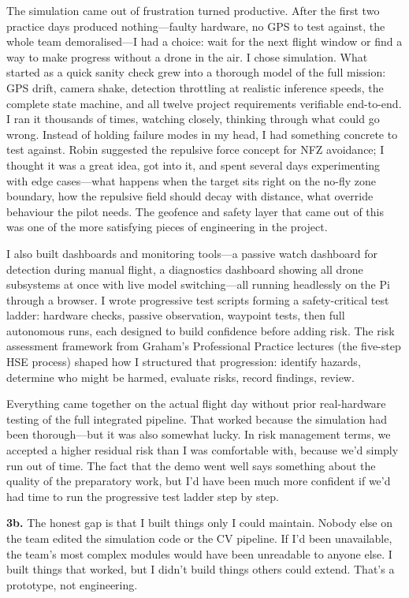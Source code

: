 The simulation came out of frustration turned productive. After the first two practice days produced nothing---faulty hardware, no GPS to test against, the whole team demoralised---I had a choice: wait for the next flight window or find a way to make progress without a drone in the air. I chose simulation. What started as a quick sanity check grew into a thorough model of the full mission: GPS drift, camera shake, detection throttling at realistic inference speeds, the complete state machine, and all twelve project requirements verifiable end-to-end. I ran it thousands of times, watching closely, thinking through what could go wrong. Instead of holding failure modes in my head, I had something concrete to test against. Robin suggested the repulsive force concept for NFZ avoidance; I thought it was a great idea, got into it, and spent several days experimenting with edge cases---what happens when the target sits right on the no-fly zone boundary, how the repulsive field should decay with distance, what override behaviour the pilot needs. The geofence and safety layer that came out of this was one of the more satisfying pieces of engineering in the project.

I also built dashboards and monitoring tools---a passive watch dashboard for detection during manual flight, a diagnostics dashboard showing all drone subsystems at once with live model switching---all running headlessly on the Pi through a browser. I wrote progressive test scripts forming a safety-critical test ladder: hardware checks, passive observation, waypoint tests, then full autonomous runs, each designed to build confidence before adding risk. The risk assessment framework from Graham's Professional Practice lectures (the five-step HSE process) shaped how I structured that progression: identify hazards, determine who might be harmed, evaluate risks, record findings, review.

Everything came together on the actual flight day without prior real-hardware testing of the full integrated pipeline. That worked because the simulation had been thorough---but it was also somewhat lucky. In risk management terms, we accepted a higher residual risk than I was comfortable with, because we'd simply run out of time. The fact that the demo went well says something about the quality of the preparatory work, but I'd have been much more confident if we'd had time to run the progressive test ladder step by step.

\textbf{3b.}
The honest gap is that I built things only I could maintain. Nobody else on the team edited the simulation code or the CV pipeline. If I'd been unavailable, the team's most complex modules would have been unreadable to anyone else. I built things that worked, but I didn't build things others could extend. That's a prototype, not engineering.

